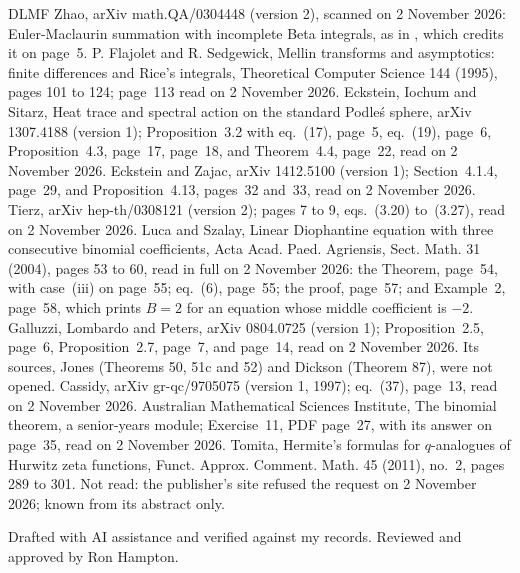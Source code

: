 \documentclass[11pt]{article}
\begin{document}
{\begin{thebibliography}{DLMF}
 Zhao, arXiv math.QA/0304448 (version 2), scanned on 2 November 2026: Euler-Maclaurin summation with incomplete Beta integrals, as in \cite{KWY}, which credits it on page~5.
 P. Flajolet and R. Sedgewick, Mellin transforms and asymptotics: finite differences and Rice's integrals, Theoretical Computer Science 144 (1995), pages 101 to 124; page~113 read on 2 November 2026.
 Eckstein, Iochum and Sitarz, Heat trace and spectral action on the standard Podle\'s sphere, arXiv 1307.4188 (version 1); Proposition~3.2 with eq.~(17), page~5, eq.~(19), page~6, Proposition~4.3, page~17, page~18, and Theorem~4.4, page~22, read on 2 November 2026.
 Eckstein and Zajac, arXiv 1412.5100 (version 1); Section~4.1.4, page~29, and Proposition~4.13, pages~32 and~33, read on 2 November 2026.
 Tierz, arXiv hep-th/0308121 (version 2); pages 7 to 9, eqs.~(3.20) to~(3.27), read on 2 November 2026.
 Luca and Szalay, Linear Diophantine equation with three consecutive binomial coefficients, Acta Acad. Paed. Agriensis, Sect. Math. 31 (2004), pages 53 to 60, read in full on 2 November 2026: the Theorem, page~54, with case~(iii) on page~55; eq.~(6), page~55; the proof, page~57; and Example~2, page~58, which prints $B=2$ for an equation whose middle coefficient is $-2$.
 Galluzzi, Lombardo and Peters, arXiv 0804.0725 (version 1); Proposition~2.5, page~6, Proposition~2.7, page~7, and page~14, read on 2 November 2026. Its sources, Jones (Theorems 50, 51c and 52) and Dickson (Theorem 87), were not opened.
 Cassidy, arXiv gr-qc/9705075 (version 1, 1997); eq.~(37), page~13, read on 2 November 2026.
 Australian Mathematical Sciences Institute, The binomial theorem, a senior-years module; Exercise~11, PDF page~27, with its answer on page~35, read on 2 November 2026.
 Tomita, Hermite's formulas for $q$-analogues of Hurwitz zeta functions, Funct. Approx. Comment. Math. 45 (2011), no.~2, pages 289 to 301. Not read: the publisher's site refused the request on 2 November 2026; known from its abstract only.
\end{thebibliography}
\par}

\bigskip
\noindent Drafted with AI assistance and verified against my records. Reviewed and approved by Ron Hampton.
\end{document}
